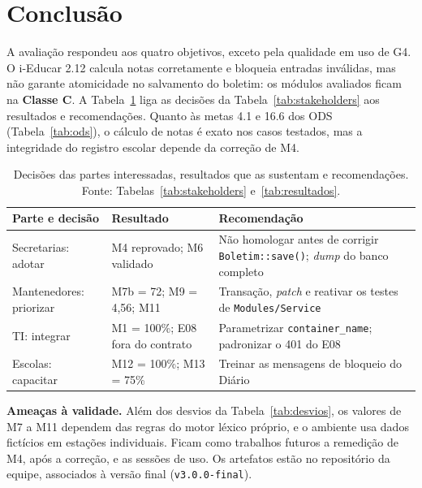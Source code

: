 \documentclass[conference]{model/IEEEtran}%
\newif\ifentregafinal  \entregafinaltrue
\begin{document}
\section{Conclusão}\label{sec:conclusao}

A avaliação respondeu aos quatro objetivos, exceto pela qualidade em uso de G4. O i-Educar 2.12 calcula notas corretamente e bloqueia entradas inválidas, mas não garante atomicidade no salvamento do boletim: os módulos avaliados ficam na \textbf{Classe C}. A Tabela~\ref{tab:decisoes} liga as decisões da Tabela~\ref{tab:stakeholders} aos resultados e recomendações. Quanto às metas 4.1 e 16.6 dos ODS (Tabela~\ref{tab:ods}), o cálculo de notas é exato nos casos testados, mas a integridade do registro escolar depende da correção de M4.

\begin{table}[!t]
\centering
\caption{Decisões das partes interessadas, resultados que as sustentam e recomendações. Fonte: Tabelas~\ref{tab:stakeholders} e~\ref{tab:resultados}.}
\label{tab:decisoes}
\scriptsize
\setlength{\tabcolsep}{2.2pt}
\begin{tabular}{@{}L{1.55cm}L{2.45cm}L{4.1cm}@{}}
\toprule
\textbf{Parte e decisão} & \textbf{Resultado} & \textbf{Recomendação} \\
\midrule
Secretarias: adotar & M4 reprovado; M6 validado & Não homologar antes de corrigir \texttt{Boletim::save()}; \textit{dump} do banco completo \\
Mantenedores: priorizar & M7b = 72; M9 = 4,56; M11 & Transação, \textit{patch} e reativar os testes de \texttt{Modules/Service} \\
TI: integrar & M1 = 100\%; E08 fora do contrato & Parametrizar \texttt{container\_name}; padronizar o 401 do E08 \\
Escolas: capacitar & M12 = 100\%; M13 = 75\% & Treinar as mensagens de bloqueio do Diário \\
\bottomrule
\end{tabular}
\end{table}

\textbf{Ameaças à validade.} Além dos desvios da Tabela~\ref{tab:desvios}, os valores de M7 a M11 dependem das regras do motor léxico próprio, e o ambiente usa dados fictícios em estações individuais. Ficam como trabalhos futuros a remedição de M4, após a correção, e as sessões de uso. Os artefatos estão no repositório da equipe, associados à versão final (\texttt{v3.0.0-final}).

\fi %
\end{document}
